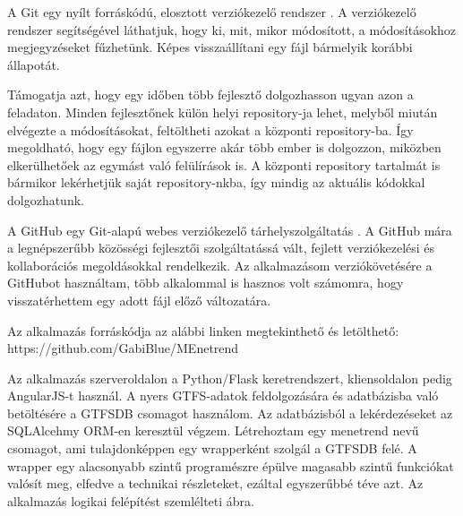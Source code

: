 
A Git egy nyílt forráskódú, elosztott verziókezelő rendszer \cite{git}. A verziókezelő rendszer segítségével láthatjuk, hogy ki, mit, mikor módosított, a módosításokhoz megjegyzéseket fűzhetünk. Képes visszaállítani egy fájl bármelyik korábbi állapotát.

Támogatja azt, hogy egy időben több fejlesztő dolgozhasson ugyan azon a feladaton. Minden fejlesztőnek külön helyi repository-ja lehet, melyből miután elvégezte a módosításokat, feltöltheti azokat a központi repository-ba. Így megoldható, hogy egy fájlon egyszerre akár több ember is dolgozzon, miközben elkerülhetőek az egymást való felülírások is. A központi repository tartalmát is bármikor lekérhetjük saját repository-nkba, így mindig az aktuális kódokkal dolgozhatunk.


A GitHub egy Git-alapú webes verziókezelő tárhelyszolgáltatás \cite{github}. A GitHub mára a legnépszerűbb közösségi fejlesztői szolgáltatássá vált, fejlett verziókezelési és kollaborációs megoldásokkal rendelkezik. Az alkalmazásom verziókövetésére a GitHubot használtam, több alkalommal is hasznos volt számomra, hogy visszatérhettem egy adott fájl előző változatára.

Az alkalmazás forráskódja az alábbi linken megtekinthető és letölthető: https://github.com/GabiBlue/MEnetrend


Az alkalmazás szerveroldalon a Python/Flask keretrendszert, kliensoldalon pedig AngularJS-t használ. A nyers GTFS-adatok feldolgozására és adatbázisba való betöltésére a GTFSDB csomagot használom. Az adatbázisból a lekérdezéseket az SQLAlcehmy ORM-en keresztül végzem. Létrehoztam egy menetrend nevű csomagot, ami tulajdonképpen egy wrapperként szolgál a GTFSDB felé. A wrapper egy alacsonyabb szintű programészre épülve magasabb szintű funkciókat valósít meg, elfedve a technikai részleteket, ezáltal egyszerűbbé téve azt. Az alkalmazás logikai felépítést szemlélteti  ábra.

